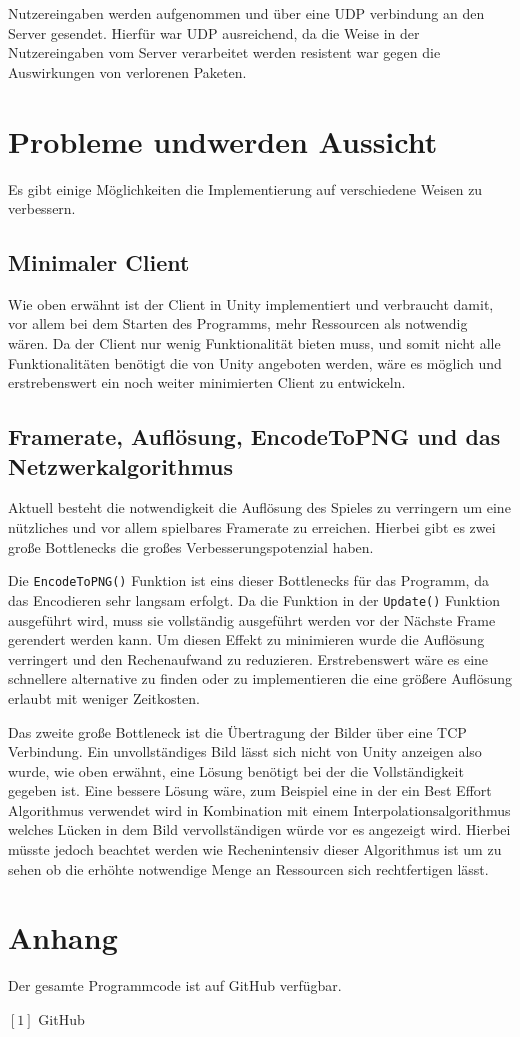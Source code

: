 \documentclass[11pt,parskip=full]{scrartcl}
\begin{document}
Nutzereingaben werden aufgenommen und über eine UDP verbindung an den Server gesendet. Hierfür war UDP ausreichend, da die Weise in der Nutzereingaben vom Server verarbeitet werden resistent war gegen die Auswirkungen von verlorenen Paketen.



\section{Probleme undwerden Aussicht}
Es gibt einige Möglichkeiten die Implementierung auf verschiedene Weisen zu verbessern.

\subsection{Minimaler Client}
Wie oben erwähnt ist der Client in Unity implementiert und verbraucht damit, vor allem bei dem Starten des Programms, mehr Ressourcen als notwendig wären. Da der Client nur wenig Funktionalität bieten muss, und somit nicht alle Funktionalitäten benötigt die von Unity angeboten werden, wäre es möglich und erstrebenswert ein noch weiter minimierten Client zu entwickeln.

\subsection{Framerate, Auflösung, EncodeToPNG und das Netzwerkalgorithmus}

Aktuell besteht die notwendigkeit die Auflösung des Spieles zu verringern um eine nützliches und vor allem spielbares Framerate zu erreichen. Hierbei gibt es zwei große Bottlenecks die großes Verbesserungspotenzial haben.

Die \lstinline{EncodeToPNG()} Funktion ist eins dieser Bottlenecks für das Programm, da das Encodieren sehr langsam erfolgt. Da die Funktion in der \lstinline{Update()} Funktion ausgeführt wird, muss sie vollständig ausgeführt werden vor der Nächste Frame gerendert werden kann. Um diesen Effekt zu minimieren wurde die Auflösung verringert und den Rechenaufwand zu reduzieren. Erstrebenswert wäre es eine schnellere alternative zu finden oder zu implementieren die eine größere Auflösung erlaubt mit weniger Zeitkosten.

Das zweite große Bottleneck ist die Übertragung der Bilder über eine TCP Verbindung. Ein unvollständiges Bild lässt sich nicht von Unity anzeigen also wurde, wie oben erwähnt, eine Lösung benötigt bei der die Vollständigkeit gegeben ist. Eine bessere Lösung wäre, zum Beispiel eine in der ein Best Effort Algorithmus verwendet wird in Kombination mit einem Interpolationsalgorithmus welches Lücken in dem Bild vervollständigen würde vor es angezeigt wird. Hierbei müsste jedoch beachtet werden wie Rechenintensiv dieser Algorithmus ist um zu sehen ob die erhöhte notwendige Menge an Ressourcen sich rechtfertigen lässt.


\section{Anhang}

Der gesamte Programmcode ist auf GitHub verfügbar.

$[1]$ GitHub
\end{document}
